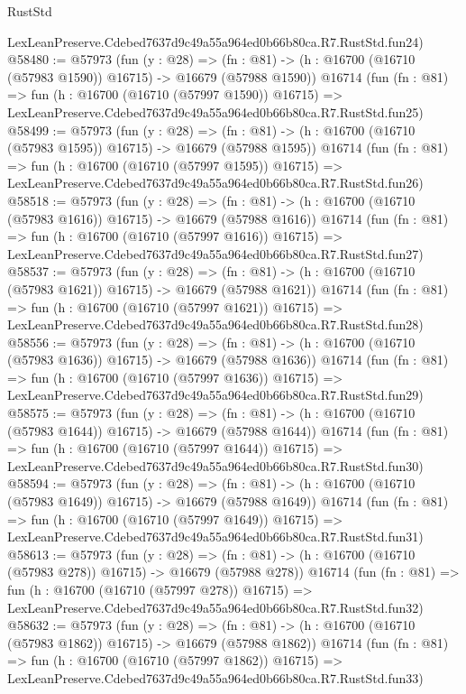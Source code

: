 \begin{lexlean}{RustStd}
\begin{coremodule}
    LexLeanPreserve.Cdebed7637d9c49a55a964ed0b66b80ca.R7.RustStd.fun24)
@58480 := @57973
    (fun (y : @28) =>
    (fn : @81) -> (h : @16700 (@16710 (@57983 @1590)) @16715) -> @16679 (@57988 @1590))
    @16714
    (fun (fn : @81) =>
    fun (h : @16700 (@16710 (@57997 @1590)) @16715) =>
    LexLeanPreserve.Cdebed7637d9c49a55a964ed0b66b80ca.R7.RustStd.fun25)
@58499 := @57973
    (fun (y : @28) =>
    (fn : @81) -> (h : @16700 (@16710 (@57983 @1595)) @16715) -> @16679 (@57988 @1595))
    @16714
    (fun (fn : @81) =>
    fun (h : @16700 (@16710 (@57997 @1595)) @16715) =>
    LexLeanPreserve.Cdebed7637d9c49a55a964ed0b66b80ca.R7.RustStd.fun26)
@58518 := @57973
    (fun (y : @28) =>
    (fn : @81) -> (h : @16700 (@16710 (@57983 @1616)) @16715) -> @16679 (@57988 @1616))
    @16714
    (fun (fn : @81) =>
    fun (h : @16700 (@16710 (@57997 @1616)) @16715) =>
    LexLeanPreserve.Cdebed7637d9c49a55a964ed0b66b80ca.R7.RustStd.fun27)
@58537 := @57973
    (fun (y : @28) =>
    (fn : @81) -> (h : @16700 (@16710 (@57983 @1621)) @16715) -> @16679 (@57988 @1621))
    @16714
    (fun (fn : @81) =>
    fun (h : @16700 (@16710 (@57997 @1621)) @16715) =>
    LexLeanPreserve.Cdebed7637d9c49a55a964ed0b66b80ca.R7.RustStd.fun28)
@58556 := @57973
    (fun (y : @28) =>
    (fn : @81) -> (h : @16700 (@16710 (@57983 @1636)) @16715) -> @16679 (@57988 @1636))
    @16714
    (fun (fn : @81) =>
    fun (h : @16700 (@16710 (@57997 @1636)) @16715) =>
    LexLeanPreserve.Cdebed7637d9c49a55a964ed0b66b80ca.R7.RustStd.fun29)
@58575 := @57973
    (fun (y : @28) =>
    (fn : @81) -> (h : @16700 (@16710 (@57983 @1644)) @16715) -> @16679 (@57988 @1644))
    @16714
    (fun (fn : @81) =>
    fun (h : @16700 (@16710 (@57997 @1644)) @16715) =>
    LexLeanPreserve.Cdebed7637d9c49a55a964ed0b66b80ca.R7.RustStd.fun30)
@58594 := @57973
    (fun (y : @28) =>
    (fn : @81) -> (h : @16700 (@16710 (@57983 @1649)) @16715) -> @16679 (@57988 @1649))
    @16714
    (fun (fn : @81) =>
    fun (h : @16700 (@16710 (@57997 @1649)) @16715) =>
    LexLeanPreserve.Cdebed7637d9c49a55a964ed0b66b80ca.R7.RustStd.fun31)
@58613 := @57973
    (fun (y : @28) =>
    (fn : @81) -> (h : @16700 (@16710 (@57983 @278)) @16715) -> @16679 (@57988 @278))
    @16714
    (fun (fn : @81) =>
    fun (h : @16700 (@16710 (@57997 @278)) @16715) =>
    LexLeanPreserve.Cdebed7637d9c49a55a964ed0b66b80ca.R7.RustStd.fun32)
@58632 := @57973
    (fun (y : @28) =>
    (fn : @81) -> (h : @16700 (@16710 (@57983 @1862)) @16715) -> @16679 (@57988 @1862))
    @16714
    (fun (fn : @81) =>
    fun (h : @16700 (@16710 (@57997 @1862)) @16715) =>
    LexLeanPreserve.Cdebed7637d9c49a55a964ed0b66b80ca.R7.RustStd.fun33)

\end{coremodule}
\end{lexlean}
